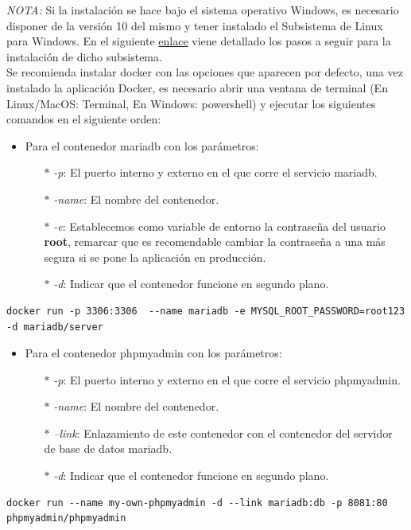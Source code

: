 \documentclass[../../main.tex]{subfiles}
\begin{document}
\textit{NOTA: } Si la instalación se hace bajo el sistema operativo Windows, es necesario disponer de la versión 10 del mismo y tener instalado el Subsistema de Linux para Windows.
En el siguiente \href{https://docs.microsoft.com/en-us/windows/wsl/install-win10}{enlace} viene detallado los pasos a seguir para la instalación de dicho subsistema.\\

Se recomienda instalar \Gls{docker} con las opciones que aparecen por defecto, una vez instalado la aplicación Docker, es necesario abrir una ventana de terminal (En Linux/MacOS: Terminal, En Windows: \gls{powershell}) y ejecutar los siguientes comandos en el siguiente orden:

\begin{itemize}
\item Para el contenedor \gls{mariadb} con los  parámetros:
\begin{itemize}
\item[$\ast$] \textit{-p}: El puerto interno y externo en el que corre el servicio \gls{mariadb}.
\item[$\ast$]\textit{-name}: El nombre del contenedor.
\item[$\ast$] \textit{-e}: Establecemos como variable de entorno la contraseña del usuario \textbf{root}, remarcar que es recomendable cambiar la contraseña a una más segura si se pone la aplicación en producción.
\item[$\ast$] \textit{-d}: Indicar que el contenedor funcione en segundo plano.
\end{itemize}
\end{itemize}
\begin{lstlisting}
docker run -p 3306:3306  --name mariadb -e MYSQL_ROOT_PASSWORD=root123 -d mariadb/server
\end{lstlisting}

\vskip 0.2in

\begin{itemize}
\item Para el contenedor \gls{phpmyadmin} con los parámetros:
\begin{itemize}
\item[$\ast$] \textit{-p}: El puerto interno y externo en el que corre el servicio \gls{phpmyadmin}.
\item[$\ast$]\textit{-name}: El nombre del contenedor.
\item[$\ast$] \textit{--link}: Enlazamiento de este contenedor con el contenedor del servidor de base de datos \gls{mariadb}.
\item[$\ast$] \textit{-d}: Indicar que el contenedor funcione en segundo plano.
\end{itemize}
\end{itemize}
\begin{lstlisting}
docker run --name my-own-phpmyadmin -d --link mariadb:db -p 8081:80 phpmyadmin/phpmyadmin
\end{lstlisting}
\end{document}
